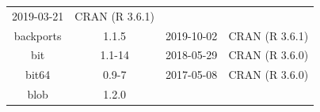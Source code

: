 \documentclass[11pt,]{book}
\begin{document}
\begin{longtable}[]{@{}cccc@{}}
\begin{minipage}[t]{0.16\columnwidth}
2019-03-21\strut
\end{minipage} & \begin{minipage}[t]{0.36\columnwidth}\centering\strut
CRAN (R 3.6.1)\strut
\end{minipage}\tabularnewline
\begin{minipage}[t]{0.18\columnwidth}\centering\strut
backports\strut
\end{minipage} & \begin{minipage}[t]{0.19\columnwidth}\centering\strut
1.1.5\strut
\end{minipage} & \begin{minipage}[t]{0.16\columnwidth}\centering\strut
2019-10-02\strut
\end{minipage} & \begin{minipage}[t]{0.36\columnwidth}\centering\strut
CRAN (R 3.6.1)\strut
\end{minipage}\tabularnewline
\begin{minipage}[t]{0.18\columnwidth}\centering\strut
bit\strut
\end{minipage} & \begin{minipage}[t]{0.19\columnwidth}\centering\strut
1.1-14\strut
\end{minipage} & \begin{minipage}[t]{0.16\columnwidth}\centering\strut
2018-05-29\strut
\end{minipage} & \begin{minipage}[t]{0.36\columnwidth}\centering\strut
CRAN (R 3.6.0)\strut
\end{minipage}\tabularnewline
\begin{minipage}[t]{0.18\columnwidth}\centering\strut
bit64\strut
\end{minipage} & \begin{minipage}[t]{0.19\columnwidth}\centering\strut
0.9-7\strut
\end{minipage} & \begin{minipage}[t]{0.16\columnwidth}\centering\strut
2017-05-08\strut
\end{minipage} & \begin{minipage}[t]{0.36\columnwidth}\centering\strut
CRAN (R 3.6.0)\strut
\end{minipage}\tabularnewline
\begin{minipage}[t]{0.18\columnwidth}\centering\strut
blob\strut
\end{minipage} & \begin{minipage}[t]{0.19\columnwidth}\centering\strut
1.2.0\strut
\end{minipage} & \begin{minipage}[t]{0.16\columnwidth}\centering\strut

\end{minipage}
\end{longtable}
\end{document}
